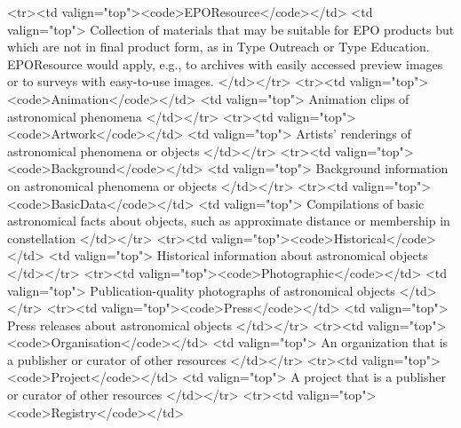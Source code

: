 \documentclass[11pt,a4paper]{ivoa}
\begin{document}
                 <tr><td valign="top"><code>EPOResource</code></td>
                     <td valign="top">
                       Collection of materials that may be suitable for EPO
               products but which are not in final product form, as in Type 
               Outreach or Type Education.  EPOResource would apply,
               e.g., to archives with easily accessed preview images or to
               surveys with easy-to-use images.
                     </td></tr>
                 <tr><td valign="top"><code>Animation</code></td>
                     <td valign="top">
                       Animation clips of astronomical phenomena
                     </td></tr>
                 <tr><td valign="top"><code>Artwork</code></td>
                     <td valign="top">
                       Artists' renderings of astronomical phenomena or objects
                     </td></tr>
                 <tr><td valign="top"><code>Background</code></td>
                     <td valign="top">
                       Background information on astronomical phenomena or
                       objects
                     </td></tr>
                 <tr><td valign="top"><code>BasicData</code></td>
                     <td valign="top">
                       Compilations of basic astronomical facts about objects,
                       such as approximate distance or membership in
                       constellation
                     </td></tr>
                 <tr><td valign="top"><code>Historical</code></td>
                     <td valign="top">
                       Historical information about astronomical objects
                     </td></tr>
                 <tr><td valign="top"><code>Photographic</code></td>
                     <td valign="top">
                       Publication-quality photographs of astronomical objects
                     </td></tr>
                 <tr><td valign="top"><code>Press</code></td>
                     <td valign="top">
                       Press releases about astronomical objects
                     </td></tr>
                 <tr><td valign="top"><code>Organisation</code></td>
                     <td valign="top">
                       An organization that is a publisher or curator of other 
                       resources
                     </td></tr>
                 <tr><td valign="top"><code>Project</code></td>
                     <td valign="top">
                       A project that is a publisher or curator of
                       other resources
                     </td></tr>
                 <tr><td valign="top"><code>Registry</code></td>
\end{document}

